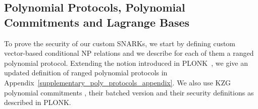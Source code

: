 \subsection{Polynomial Protocols, Polynomial Commitments and Lagrange Bases}
To prove the security of our custom SNARKs, we start by defining custom vector-based conditional NP relations and we describe for each of them a ranged polynomial protocol. 
Extending the notion introduced in PLONK~\cite{plonk}, we give an updated definition of ranged polynomial protocols in Appendix~\ref{supplementary_poly_protocols_appendix}. 
We also use KZG polynomial commitments \cite{KZG_10}, their batched version and their security definitions as described in PLONK. 
\vspace{-0.07in}


